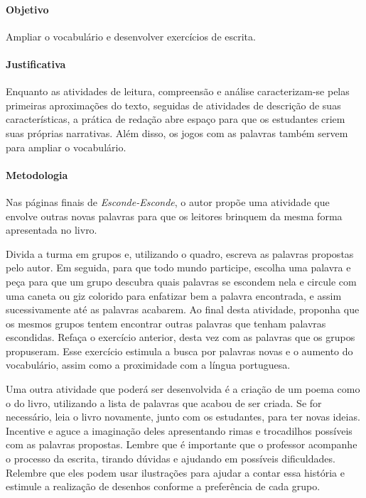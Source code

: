 \documentclass[11pt]{extarticle}
\begin{document}
\paragraph{Objetivo} Ampliar o vocabulário e desenvolver exercícios de escrita.

\paragraph{Justificativa} Enquanto as atividades de leitura, compreensão e análise caracterizam-se pelas primeiras aproximações do texto, seguidas de atividades de descrição de suas características, a prática de redação abre espaço para que os estudantes criem suas próprias narrativas. Além disso, os jogos com as palavras também servem para ampliar o vocabulário. 

\paragraph{Metodologia} Nas páginas finais de \textit{Esconde-Esconde}, o autor propõe uma atividade que envolve outras novas palavras para que os leitores brinquem da mesma forma apresentada no livro. 

Divida a turma em grupos e, utilizando o quadro, escreva as palavras propostas pelo autor. Em seguida, para que todo mundo participe, escolha uma palavra e peça para que um grupo descubra quais palavras se escondem nela e circule com uma caneta ou giz colorido para enfatizar bem a palavra encontrada, e assim sucessivamente até as palavras acabarem. Ao final desta atividade, proponha que os mesmos grupos tentem encontrar outras palavras que tenham palavras escondidas. Refaça o exercício anterior, desta vez com as palavras que os grupos propuseram. Esse exercício estimula a busca por palavras novas e o aumento do vocabulário, assim como a proximidade com a língua portuguesa.

Uma outra atividade que poderá ser desenvolvida é a criação de um poema como o do livro, utilizando a lista de palavras que acabou de ser criada. Se for necessário, leia  o livro novamente, junto com os estudantes, para ter novas ideias. Incentive e aguce a imaginação deles apresentando rimas e trocadilhos possíveis com as palavras propostas. Lembre que é importante que o professor acompanhe o processo da escrita, tirando dúvidas e ajudando em possíveis dificuldades. Relembre que eles podem usar ilustrações para ajudar a contar essa história e estimule a realização de desenhos conforme a preferência de cada grupo.
\end{document}
